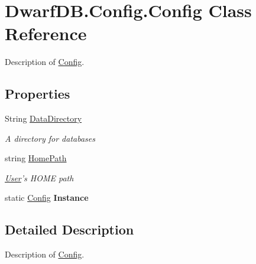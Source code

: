 \hypertarget{class_dwarf_d_b_1_1_config_1_1_config}{\section{Dwarf\+D\+B.\+Config.\+Config Class Reference}
\label{class_dwarf_d_b_1_1_config_1_1_config}
}


Description of \hyperlink{class_dwarf_d_b_1_1_config_1_1_config}{Config}.  


\subsection*{Properties}
\begin{DoxyCompactItemize}
\item 
String \hyperlink{class_dwarf_d_b_1_1_config_1_1_config_afcb080c4360c0c344d2b9d9ecb72c297}{Data\+Directory}
\begin{DoxyCompactList}\small\item\em A directory for databases \end{DoxyCompactList}\item 
string \hyperlink{class_dwarf_d_b_1_1_config_1_1_config_a390a89963606ed0009489bfe8b46160d}{Home\+Path}
\begin{DoxyCompactList}\small\item\em \hyperlink{namespace_dwarf_d_b_1_1_user}{User}'s H\+O\+M\+E path \end{DoxyCompactList}\item 
\hypertarget{class_dwarf_d_b_1_1_config_1_1_config_af1db0cd463b4f00c1a1b7fd4373b230a}{static \hyperlink{class_dwarf_d_b_1_1_config_1_1_config}{Config} {\bfseries Instance}}\label{class_dwarf_d_b_1_1_config_1_1_config_af1db0cd463b4f00c1a1b7fd4373b230a}

\end{DoxyCompactItemize}


\subsection{Detailed Description}
Description of \hyperlink{class_dwarf_d_b_1_1_config_1_1_config}{Config}. 



